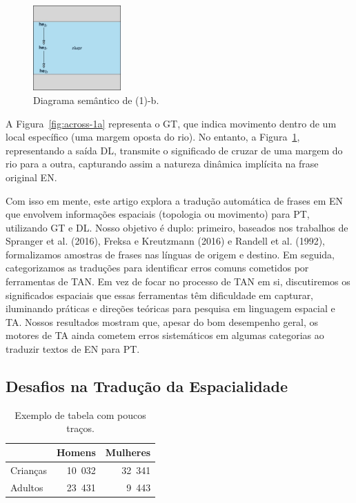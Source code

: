 \documentclass[a4paper, twocolumn, 11pt, twoside]{article}
\begin{document}
\begin{figure}[ht]
  \centering
  \includegraphics[width=0.3\textwidth]{bb-b-2.jpg}
  \caption{Diagrama semântico de (1)-b.}\label{fig:across-1b}
\end{figure}


A Figura~\ref{fig:across-1a} representa o GT, que indica movimento dentro de um local específico (uma margem oposta do rio). No entanto, a Figura~\ref{fig:across-1b}, representando a saída DL, transmite o significado de cruzar de uma margem do rio para a outra, capturando assim a natureza dinâmica implícita na frase original EN. 

Com isso em mente, este artigo explora a tradução automática de frases em EN que envolvem informações espaciais (topologia ou movimento) para PT, utilizando GT e DL. Nosso objetivo é duplo: primeiro, baseados nos trabalhos de Spranger et al. (2016), Freksa e Kreutzmann (2016) e Randell et al. (1992), formalizamos amostras de frases nas línguas de origem e destino. Em seguida, categorizamos as traduções para identificar erros comuns cometidos por ferramentas de TAN. Em vez de focar no processo de TAN em si, discutiremos os significados espaciais que essas ferramentas têm dificuldade em capturar, iluminando práticas e direções teóricas para pesquisa em linguagem espacial e TA. Nossos resultados mostram que, apesar do bom desempenho geral, os motores de TA ainda cometem erros sistemáticos em algumas categorias ao traduzir textos de EN para PT.


\subsection{Desafios na Tradução da Espacialidade}


\begin{table}[htb]
  \centering
  \begin{tabular}{lrr}
    \toprule
    & \textbf{Homens} & \textbf{Mulheres} \\
    \midrule
    Crianças & 10~032 & 32~341 \\
    Adultos & 23~431 & 9~443 \\
    \bottomrule
  \end{tabular}
  \caption{Exemplo de tabela com poucos traços.}
  \label{tab:1}
\end{table}
\end{document}
